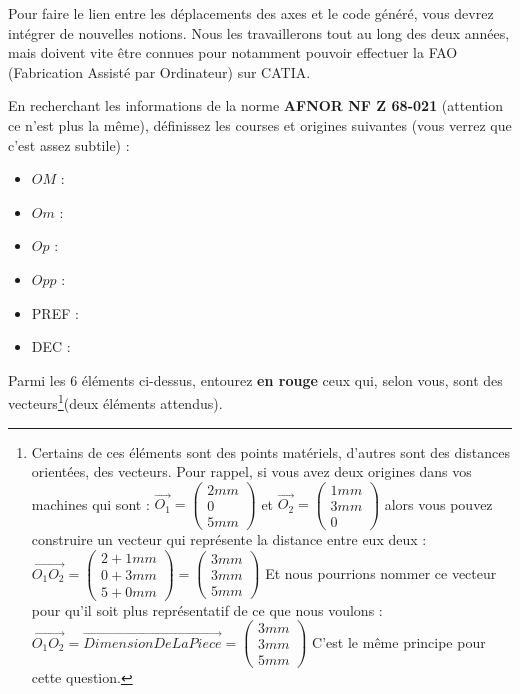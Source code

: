 \documentclass[12pt]{article}
\newcounter{exo}
\newenvironment{exo}{\stepcounter{exo}\vspace{0.5cm}{\bfseries Question \theexo\ :}}{\par\vspace{0.5cm}}
\begin{document}
Pour faire le lien entre les déplacements des axes et le code généré, vous devrez intégrer de nouvelles notions. Nous les travaillerons tout au long des deux années, mais doivent vite être connues pour notamment pouvoir effectuer la FAO (Fabrication Assisté par Ordinateur) sur CATIA.

\begin{exo}\label{exo1} En recherchant les informations de la norme \textbf{AFNOR NF Z 68-021} (attention ce n'est plus la même), définissez les courses et origines suivantes (vous verrez que c'est assez subtile) :\end{exo}
\begin{itemize}
    \item $OM$ :
    \item $Om$ :
    \item $Op$ :
    \item $Opp$ :
    \item PREF :
    \item DEC :
\end{itemize}

\begin{exo}\label{exo66} Parmi les 6 éléments ci-dessus, entourez \textbf{en rouge} ceux qui, selon vous, sont des vecteurs\footnote{Certains de ces éléments sont des points matériels, d'autres sont des distances orientées, des vecteurs. Pour rappel, si vous avez deux origines dans vos machines qui sont : $\vec{O_1} =\begin{pmatrix} 2mm\\0\\5mm \end{pmatrix}$ et $\vec{O_2} =\begin{pmatrix} 1mm\\3mm\\0 \end{pmatrix}$ alors vous pouvez construire un vecteur qui représente la distance entre eux deux : $\overrightarrow{O_1O_2} =\begin{pmatrix} 2 + 1mm\\0 + 3 mm\\5 + 0mm \end{pmatrix}=\begin{pmatrix} 3mm\\3 mm\\5mm \end{pmatrix}$ Et nous pourrions nommer ce vecteur pour qu'il soit plus représentatif de ce que nous voulons :\\ $\overrightarrow{O_1O_2}=\overrightarrow{Dimension De La Piece}=\begin{pmatrix} 3mm\\3 mm\\5mm \end{pmatrix}$ C'est le même principe pour cette question.}(deux éléments attendus).  \end{exo}
\end{document}
